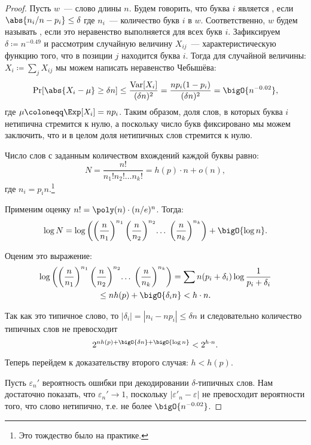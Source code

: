 \begin{proof}
    Пусть $w$~--- слово длины $n$. Будем говорить, что буква $i$ является ,
    если $\abs{n_i / n - p_i} \le \delta$ где $n_i$~--- количество букв $i$ в $w$. Соответственно, $w$
    будем называть , если это неравенство выполняется для всех букв
    $i$. Зафиксируем $\delta \coloneqq n^{-0.49}$ и рассмотрим случайную величину $X_{ij}$~---
    характеристическую функцию того, что в позиции $j$ находится буква $i$. Тогда для случайной величины:
    $X_i \coloneqq \sum_j X_{ij}$ мы можем написать неравенство Чебышёва:
    $$
        \Pr[\abs{X_i - \mu} \ge \delta n] \le \frac{\operatorname{Var}[X_i]}{(\delta n)^2} =
        \frac{n p_i (1 - p_i)}{(\delta n)^2} = \bigO{n^{-0.02}},
    $$
    где $\mu \coloneqq \Exp[X_i] = np_i$. Таким образом, доля слов, в которых буква $i$ нетипична
    стремится к нулю, а поскольку число букв фиксировано мы можем заключить, что и в целом доля
    нетипичных слов стремится к нулю. 
    
    Число слов с заданным количеством вхождений каждой буквы равно:
    $$
        N = \frac{n!}{n_1!n_2!\dots n_k!} = h(p) \cdot n + o(n),
    $$
    где $n_i = p_in$.\footnote{Это тождество было на практике.}
    
    Применим оценку $n! = \poly(n) \cdot (n / e)^n$. Тогда:
    $$
        \log{N} =
        \log\left(\left(\frac{n}{n_1}\right)^{n_1} \left(\frac{n}{n_2}\right)^{n_2} \!\ldots\;
          \left(\frac{n}{n_k}\right)^{n_k} \right)
        + \bigO{\log n}.
    $$

    Оценим это выражение:
    \begin{multline*}
        \log\left(\left(\frac{n}{n_1}\right)^{n_1} \left(\frac{n}{n_2}\right)^{n_2}
          \!\ldots\;\left(\frac{n}{n_k}\right)^{n_k} \right)
        = \sum n(p_i + \delta_i) \log\frac{1}{p_i + \delta_i}\\
        \le n h(p) + \bigO{\delta_i n} < h \cdot n.
    \end{multline*}
    
    Так как это типичное слово, то $|\delta_i| = |n_i - np_i| \le \delta n$ и следовательно количество
    типичных слов не превосходит
    $$
        2^{n h(p) + \bigO{\delta n} + \bigO{\log n}} < 2^{h \cdot n}.
    $$

    Теперь перейдем к доказательству второго случая: $h < h(p)$.
    
    Пусть $\varepsilon_n'$ вероятность ошибки при декодировании $\delta$-типичных слов. Нам достаточно
    показать, что $\varepsilon_n' \to 1$, поскольку $|\varepsilon'_n - \varepsilon|$ не 
    превосходит вероятности того, что слово нетипично, т.е. не более $\bigO{n^{-0.02}}$.
    

\end{proof}
